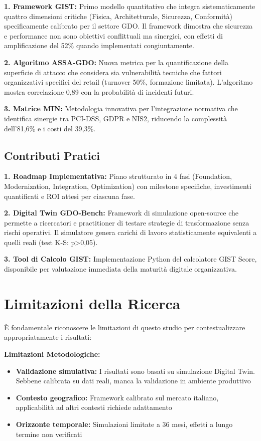 \textbf{1. Framework GIST:} Primo modello quantitativo che integra sistematicamente quattro dimensioni critiche (Fisica, Architetturale, Sicurezza, Conformità) specificamente calibrato per il settore GDO. Il framework dimostra che sicurezza e performance non sono obiettivi conflittuali ma sinergici, con effetti di amplificazione del 52\% quando implementati congiuntamente.

\textbf{2. Algoritmo ASSA-GDO:} Nuova metrica per la quantificazione della superficie di attacco che considera sia vulnerabilità tecniche che fattori organizzativi specifici del retail (turnover 50\%, formazione limitata). L'algoritmo mostra correlazione 0,89 con la probabilità di incidenti futuri.

\textbf{3. Matrice MIN:} Metodologia innovativa per l'integrazione normativa che identifica sinergie tra PCI-DSS, GDPR e NIS2, riducendo la complessità dell'81,6\% e i costi del 39,3\%.

\subsection{Contributi Pratici}
\label{subsec:contributi_pratici}

\textbf{1. Roadmap Implementativa:} Piano strutturato in 4 fasi (Foundation, Modernization, Integration, Optimization) con milestone specifiche, investimenti quantificati e ROI attesi per ciascuna fase.

\textbf{2. Digital Twin GDO-Bench:} Framework di simulazione open-source che permette a ricercatori e practitioner di testare strategie di trasformazione senza rischi operativi. Il simulatore genera carichi di lavoro statisticamente equivalenti a quelli reali (test K-S: p>0,05).

\textbf{3. Tool di Calcolo GIST:} Implementazione Python del calcolatore GIST Score, disponibile per valutazione immediata della maturità digitale organizzativa.

\section{Limitazioni della Ricerca}
\label{sec:limitazioni}

È fondamentale riconoscere le limitazioni di questo studio per contestualizzare appropriatamente i risultati:

\textbf{Limitazioni Metodologiche:}
\begin{itemize}
\item \textbf{Validazione simulativa:} I risultati sono basati su simulazione Digital Twin. Sebbene calibrata su dati reali, manca la validazione in ambiente produttivo
\item \textbf{Contesto geografico:} Framework calibrato sul mercato italiano, applicabilità ad altri contesti richiede adattamento
\item \textbf{Orizzonte temporale:} Simulazioni limitate a 36 mesi, effetti a lungo termine non verificati
\end{itemize}

